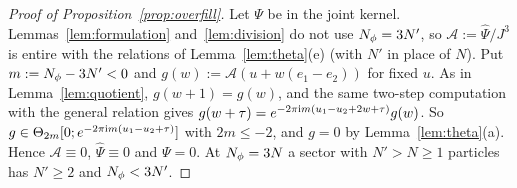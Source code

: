 \begin{proof}[Proof of Proposition~\ref{prop:overfill}]
Let $\Psi$ be in the joint kernel. Lemmas~\ref{lem:formulation} and~\ref{lem:division} do not use $N_{\phi}=3N'$, so
$\mathcal A:=\widehat\Psi/J^3$ is entire with the relations of Lemma~\ref{lem:theta}(e) (with $N'$ in place of $N$). Put $m:=N_{\phi}-3N'<0$
and $g(w):=\mathcal A(u+w(e_1-e_2))$ for fixed $u$. As in Lemma~\ref{lem:quotient}, $g(w+1)=g(w)$, and the same two-step
computation with the general relation gives $g(w+\tau)=e^{-2\pi\mathrm{i} m(u_1-u_2+2w+\tau)}g(w)$. So
$g\in\Theta_{2m}[0;e^{-2\pi\mathrm{i} m(u_1-u_2+\tau)}]$ with $2m\le-2$, and $g=0$ by Lemma~\ref{lem:theta}(a). Hence $\mathcal A\equiv0$,
$\widehat\Psi\equiv0$ and $\Psi=0$. At $N_{\phi}=3N$ a sector with $N'>N\ge1$ particles has $N'\ge2$ and $N_{\phi}<3N'$.
\end{proof}
